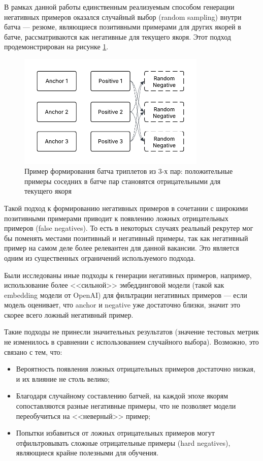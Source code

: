 \documentclass[14pt]{mmcs_article}
\begin{document}
В рамках данной работы единственным реализуемым способом генерации негативных примеров оказался случайный выбор (random sampling) внутри батча --- резюме, являющиеся позитивными примерами для других якорей в батче, рассматриваются как негативные для текущего якоря. Этот подход продемонстрирован на рисунке \ref{fig:batch_triplets}.

\begin{figure}[h]
  \centering
  \includegraphics[width=0.8\textwidth]{plots/batch_triplets.pdf}
  \caption{\centering Пример формирования батча триплетов из 3-х пар: положительные примеры соседних в батче пар становятся отрицательными для текущего якоря}
  \label{fig:batch_triplets}
\end{figure}

Такой подход к формированию негативных примеров в сочетании с широкими позитивными примерами приводит к появлению ложных отрицательных примеров (false negatives). То есть в некоторых случаях реальный рекрутер мог бы поменять местами позитивный и негативный примеры, так как негативный пример на самом деле более релевантен для данной вакансии. Это является одним из существенных ограничений используемого подхода.

Были исследованы иные подходы к генерации негативных примеров, например, использование более <<сильной>> эмбеддинговой модели (такой как embedding модели от OpenAI) для фильтрации негативных примеров --- если модель оценивает, что anchor и negative уже достаточно близки, значит это скорее всего ложный негативный пример.

Такие подходы не принесли значительных результатов (значение тестовых метрик не изменилось в сравнении с использованием случайного выбора). Возможно, это связано с тем, что:

\begin{itemize}
  \item Вероятность появления ложных отрицательных примеров достаточно низкая, и их влияние не столь велико;
  \item Благодаря случайному составлению батчей, на каждой эпохе якорям сопоставляются разные негативные примеры, что не позволяет модели переобучиться на <<неверный>> пример;
  \item Попытки избавиться от ложных отрицательных примеров могут отфильтровывать сложные отрицательные примеры (hard negatives), являющиеся крайне полезными для обучения.
\end{itemize}
\end{document}
